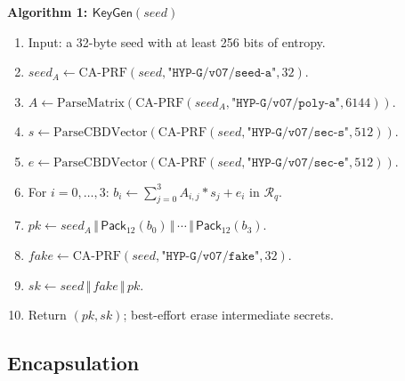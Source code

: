 \documentclass[runningheads]{llncs}
\newcommand{\concat}{\,\Vert\,}
\newcommand{\Ring}{\mathcal{R}_q}
\newcommand{\KeyGen}{\mathsf{KeyGen}}
\newcommand{\Pack}{\mathsf{Pack}}
\newenvironment{steps}[1]
  {\par\medskip\noindent\textbf{#1}\par\nopagebreak\small
   \begin{enumerate}[label=\arabic*:,leftmargin=*]}
  {\end{enumerate}\par\medskip}
\begin{document}
\begin{steps}{Algorithm 1: $\KeyGen(\mathit{seed})$}
\item Input: a 32-byte seed with at least 256 bits of entropy.
\item $\mathit{seed}_A\gets\mathrm{CA\text{-}PRF}(\mathit{seed},
  \texttt{"HYP-G/v07/seed-a"},32)$.
\item $A\gets\mathrm{ParseMatrix}(
  \mathrm{CA\text{-}PRF}(\mathit{seed}_A,
  \texttt{"HYP-G/v07/poly-a"},6144))$.
\item $s\gets\mathrm{ParseCBDVector}(
  \mathrm{CA\text{-}PRF}(\mathit{seed},
  \texttt{"HYP-G/v07/sec-s"},512))$.
\item $e\gets\mathrm{ParseCBDVector}(
  \mathrm{CA\text{-}PRF}(\mathit{seed},
  \texttt{"HYP-G/v07/sec-e"},512))$.
\item For $i=0,\ldots,3$:
  $b_i\gets\sum_{j=0}^{3}A_{i,j}*s_j+e_i$ in $\Ring$.
\item $pk\gets\mathit{seed}_A\concat\Pack_{12}(b_0)\concat\cdots
  \concat\Pack_{12}(b_3)$.
\item $\mathit{fake}\gets\mathrm{CA\text{-}PRF}(\mathit{seed},
  \texttt{"HYP-G/v07/fake"},32)$.
\item $sk\gets\mathit{seed}\concat\mathit{fake}\concat pk$.
\item Return $(pk,sk)$; best-effort erase intermediate secrets.
\end{steps}

\subsection{Encapsulation}
\end{document}
